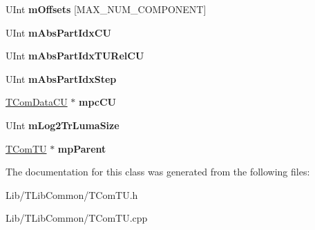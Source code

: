 \begin{DoxyCompactItemize}
\mbox{\label{class_t_com_t_u_ac4e228e1b273df05db85de83eedb926c}} 
U\+Int {\bfseries m\+Offsets} \mbox{[}M\+A\+X\+\_\+\+N\+U\+M\+\_\+\+C\+O\+M\+P\+O\+N\+E\+NT\mbox{]}
\item 
\mbox{\label{class_t_com_t_u_a29145abd140dda6d1204eee4e34904a1}} 
U\+Int {\bfseries m\+Abs\+Part\+Idx\+CU}
\item 
\mbox{\label{class_t_com_t_u_ae29a393a22d69e4722e11fbfbca7f440}} 
U\+Int {\bfseries m\+Abs\+Part\+Idx\+T\+U\+Rel\+CU}
\item 
\mbox{\label{class_t_com_t_u_ad72b82190ae671d4d38cb90c170affe9}} 
U\+Int {\bfseries m\+Abs\+Part\+Idx\+Step}
\item 
\mbox{\label{class_t_com_t_u_a65bd3f828a4ea43cca9e2349c9269b75}} 
\hyperlink{class_t_com_data_c_u}{T\+Com\+Data\+CU} $\ast$ {\bfseries mpc\+CU}
\item 
\mbox{\label{class_t_com_t_u_a4ae768ce870c5d1cf8f7fc9eb8022676}} 
U\+Int {\bfseries m\+Log2\+Tr\+Luma\+Size}
\item 
\mbox{\label{class_t_com_t_u_a7fb71a24c6165bead5baea752eb0b557}} 
\hyperlink{class_t_com_t_u}{T\+Com\+TU} $\ast$ {\bfseries mp\+Parent}
\end{DoxyCompactItemize}


The documentation for this class was generated from the following files\+:\begin{DoxyCompactItemize}
\item 
Lib/\+T\+Lib\+Common/T\+Com\+T\+U.\+h\item 
Lib/\+T\+Lib\+Common/T\+Com\+T\+U.\+cpp\end{DoxyCompactItemize}
